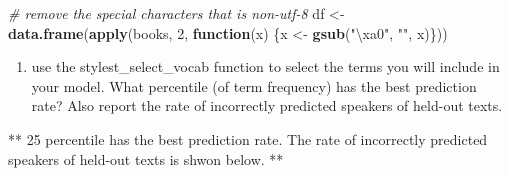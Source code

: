\documentclass[]{article}
\newenvironment{Shaded}{\begin{snugshade}}{\end{snugshade}}
\newcommand{\KeywordTok}[1]{\textcolor[rgb]{0.13,0.29,0.53}{\textbf{#1}}}
\newcommand{\DataTypeTok}[1]{\textcolor[rgb]{0.13,0.29,0.53}{#1}}
\newcommand{\DecValTok}[1]{\textcolor[rgb]{0.00,0.00,0.81}{#1}}
\newcommand{\CharTok}[1]{\textcolor[rgb]{0.31,0.60,0.02}{#1}}
\newcommand{\StringTok}[1]{\textcolor[rgb]{0.31,0.60,0.02}{#1}}
\newcommand{\CommentTok}[1]{\textcolor[rgb]{0.56,0.35,0.01}{\textit{#1}}}
\newcommand{\OtherTok}[1]{\textcolor[rgb]{0.56,0.35,0.01}{#1}}
\newcommand{\ControlFlowTok}[1]{\textcolor[rgb]{0.13,0.29,0.53}{\textbf{#1}}}
\newcommand{\OperatorTok}[1]{\textcolor[rgb]{0.81,0.36,0.00}{\textbf{#1}}}
\newcommand{\NormalTok}[1]{#1}
\providecommand{\tightlist}{%
  \setlength{\itemsep}{0pt}\setlength{\parskip}{0pt}}
\begin{document}
\begin{Shaded}
\begin{Highlighting}[]
\CommentTok{# remove the special characters that is non-utf-8}
\NormalTok{df <-}\StringTok{ }\KeywordTok{data.frame}\NormalTok{(}\KeywordTok{apply}\NormalTok{(books, }\DecValTok{2}\NormalTok{, }\ControlFlowTok{function}\NormalTok{(x) \{x <-}\StringTok{ }\KeywordTok{gsub}\NormalTok{(}\StringTok{"}\CharTok{\textbackslash{}xa0}\StringTok{"}\NormalTok{, }\StringTok{""}\NormalTok{, x)\}))}
\end{Highlighting}
\end{Shaded}

\begin{enumerate}
\def\labelenumi{\alph{enumi})}
\setcounter{enumi}{2}
\tightlist
\item
  use the stylest\_select\_vocab function to select the terms you will
  include in your model. What percentile (of term frequency) has the
  best prediction rate? Also report the rate of incorrectly predicted
  speakers of held-out texts.
\end{enumerate}

** 25 percentile has the best prediction rate. The rate of incorrectly
predicted speakers of held-out texts is shwon below. **

\begin{Shaded}
\end{Shaded}
\end{document}
